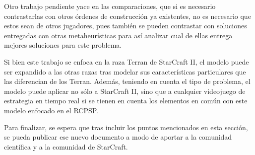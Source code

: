 Otro trabajo pendiente yace en las comparaciones, que si es necesario contrastarlas con otros órdenes de construcción ya existentes, no es necesario que estos sean de otros jugadores, pues también se pueden contrastar con soluciones entregadas con otras metaheurísticas para así analizar cual de ellas entrega mejores soluciones para este problema.

Si bien este trabajo se enfoca en la raza Terran de StarCraft II, el modelo puede ser expandido a las otras razas tras modelar sus características particulares que las diferencian de los Terran. Además, teniendo en cuenta el tipo de problema, el modelo puede aplicar no sólo a StarCraft II, sino que a cualquier videojuego de estrategia en tiempo real si se tienen en cuenta los elementos en común con este modelo enfocado en el RCPSP.

Para finalizar, se espera que tras incluir los puntos mencionados en esta sección, se pueda publicar ese nuevo documento a modo de aportar a la comunidad científica y a la comunidad de StarCraft.

\nocite{*}